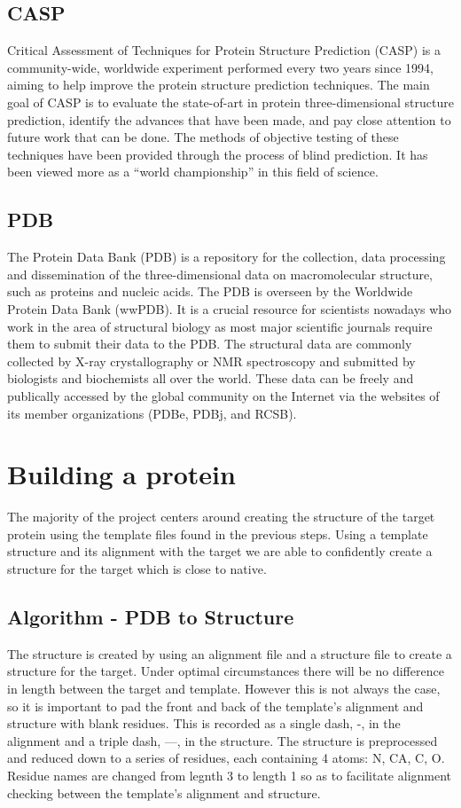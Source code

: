 \documentclass{article}
\begin{document}
\subsection{CASP}

Critical Assessment of Techniques for Protein Structure Prediction (CASP) is a community-wide, worldwide experiment performed every two years since 1994, aiming to help improve the protein structure prediction techniques. The main goal of CASP is to evaluate the state-of-art in protein three-dimensional structure prediction, identify the advances that have been made, and pay close attention to future work that can be done. The methods of objective testing of these techniques have been provided through the process of blind prediction. It has been viewed more as a “world championship” in this field of science. 
\subsection{PDB}

The Protein Data Bank (PDB) is a repository for the collection, data processing and dissemination of the three-dimensional data on macromolecular structure, such as proteins and nucleic acids. The PDB is overseen by the Worldwide Protein Data Bank (wwPDB). It is a crucial resource for scientists nowadays who work in the area of structural biology as most major scientific journals require them to submit their data to the PDB. The structural data are commonly collected by X-ray crystallography or NMR spectroscopy and submitted by biologists and biochemists all over the world. These data can be freely and publically accessed by the global community on the Internet via the websites of its member organizations (PDBe, PDBj, and RCSB). 

\section{Building a protein}

The majority of the project centers around creating the structure of the target protein using the template files found in the previous steps. Using a template structure and its alignment with the target we are able to confidently create a structure for the target which is close to native.
\subsection{Algorithm - PDB to Structure}

The structure is created by using an alignment file and a structure file to create a structure for the target. Under optimal circumstances there will be no difference in length between the target and template. However this is not always the case, so it is important to pad the front and back of the template's alignment and structure with blank residues. This is recorded as a single dash, -, in the alignment and a triple dash, ---, in the structure. The structure is preprocessed and reduced down to a series of residues, each containing 4 atoms: N, CA, C, O. Residue names are changed from legnth 3 to length 1 so as to facilitate alignment checking between the template's alignment and structure.
\end{document}
